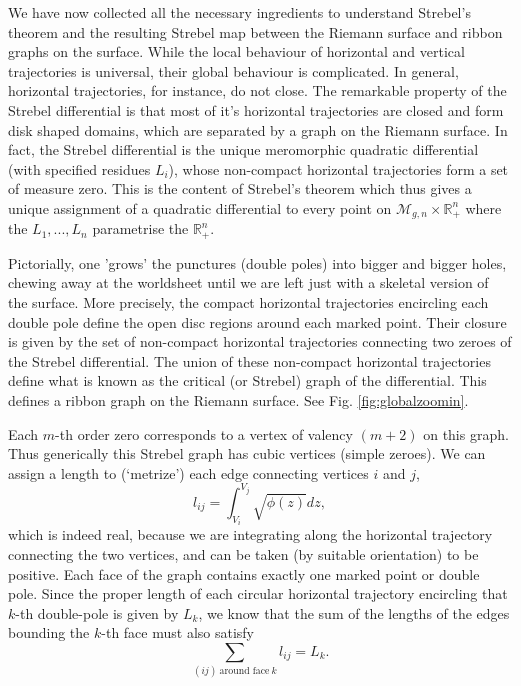 \documentclass[english]{article}
\let\mb=\mathbb
\begin{document}
We have now collected all the necessary ingredients to understand Strebel's theorem and the resulting Strebel map between the Riemann surface and ribbon graphs on the surface. 
While the local behaviour of horizontal and vertical trajectories is universal, their global behaviour is complicated. In general, horizontal trajectories, for instance, do not close. 
The remarkable property of the Strebel differential is that most of it's horizontal trajectories are closed and form disk shaped domains, which are separated by a graph on the Riemann surface. In fact, the Strebel differential is the unique meromorphic quadratic  differential (with specified residues $L_i$), whose non-compact horizontal trajectories form a set of measure zero.
This is the content of Strebel's theorem which thus gives a unique assignment of a quadratic differential to every point on ${\mathcal M}_{g,n}\times {\mathbb R}_+^n$ where the $L_1,...,L_n$ parametrise the $\mb{R}^{n}_{+}$.  

Pictorially, one 'grows' the punctures (double poles) into bigger and bigger holes, chewing away at the worldsheet until we are left just with a skeletal version of the surface. More precisely, the compact horizontal trajectories encircling each double pole define the open disc regions around each marked point. Their closure is given by the set of non-compact horizontal trajectories connecting two zeroes of the Strebel differential. The union of these non-compact horizontal trajectories define what is known as the critical (or Strebel) graph of the differential. This defines a ribbon graph on the Riemann surface. See Fig. \ref{fig:globalzoomin}. 
 
Each $m$-th order zero corresponds to a vertex of valency $(m+2)$ on this graph. Thus generically this Strebel graph has cubic vertices (simple zeroes). We can assign a length to (`metrize') each edge connecting vertices $i$ and $j$,
\begin{equation}
    l_{ij} = \int_{V_i}^{V_j} \sqrt{\phi(z)}dz ,
\end{equation}
which is indeed real, because we are integrating along the horizontal trajectory connecting the two vertices, and can be taken (by suitable orientation) to be positive. Each face of the graph contains exactly one marked point or double pole. Since the proper length of each circular horizontal trajectory encircling that $k$-th double-pole is given by $L_k$, we know that the sum of the lengths of the edges bounding the $k$-th face must also satisfy
\begin{equation}
    \sum_{(ij)\  \text{around face} \ k} l_{ij} = L_{k}.
\end{equation}
\end{document}
